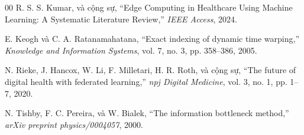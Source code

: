 \documentclass[conference]{IEEEtran}
\begin{document}
\begin{thebibliography}{00}
R. S. S. Kumar, và cộng sự, ``Edge Computing in Healthcare Using Machine Learning: A Systematic Literature Review,'' \textit{IEEE Access}, 2024.

E. Keogh và C. A. Ratanamahatana, ``Exact indexing of dynamic time warping,'' \textit{Knowledge and Information Systems}, vol. 7, no. 3, pp. 358--386, 2005.

N. Rieke, J. Hancox, W. Li, F. Milletari, H. R. Roth, và cộng sự, ``The future of digital health with federated learning,'' \textit{npj Digital Medicine}, vol. 3, no. 1, pp. 1--7, 2020.

N. Tishby, F. C. Pereira, và W. Bialek, ``The information bottleneck method,'' \textit{arXiv preprint physics/0004057}, 2000.
\end{thebibliography}
\end{document}
